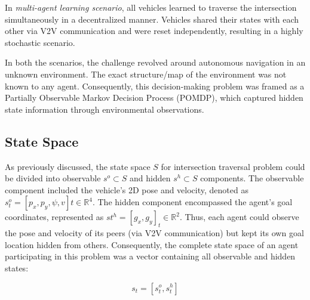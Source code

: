 \documentclass[letterpaper, 10 pt, conference]{ieeeconf}  %
\begin{document}
	In \textit{multi-agent learning scenario}, all vehicles learned to traverse the intersection simultaneously in a decentralized manner. Vehicles shared their states with each other via V2V communication and were reset independently, resulting in a highly stochastic scenario.
	
	In both the scenarios, the challenge revolved around autonomous navigation in an unknown environment. The exact structure/map of the environment was not known to any agent. Consequently, this decision-making problem was framed as a Partially Observable Markov Decision Process (POMDP), which captured hidden state information through environmental observations.
	
	\subsection{State Space}
	\label{Sub-Section: State Space I}
	
	As previously discussed, the state space $S$ for intersection traversal problem could be divided into observable $s^o \subset S$ and hidden $s^h \subset S$ components. The observable component included the vehicle's 2D pose and velocity, denoted as $s_{t}^{o}=\left [ p_{x}, p_{y}, \psi, v \right ]{t} \in \mathbb{R}^{4}$. The hidden component encompassed the agent's goal coordinates, represented as $s{t}^{h}=\left [ g_{x}, g_{y} \right ]_{t} \in \mathbb{R}^{2}$. Thus, each agent could observe the pose and velocity of its peers (via V2V communication) but kept its own goal location hidden from others. Consequently, the complete state space of an agent participating in this problem was a vector containing all observable and hidden states:
	
	\begin{equation}
	\label{eqn1}
	s_{t} = \left [ s_{t}^{o}, s_{t}^{h} \right ]
	\end{equation}
	
\end{document}
